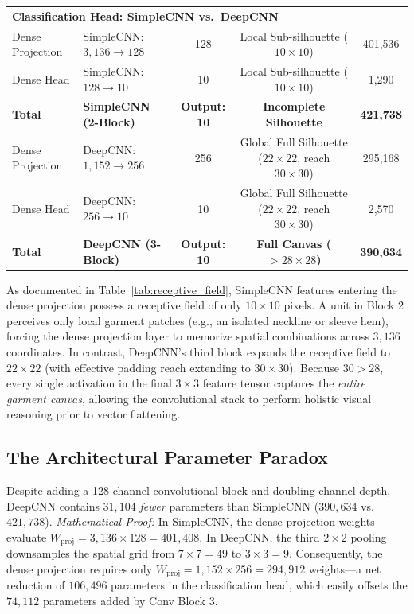 \documentclass[conference]{IEEEtran}
\begin{document}
\begin{table}[t]
\begin{tabular*}{\textwidth}{@{\extracolsep{\fill}}llccc@{}}
\midrule
\multicolumn{5}{l}{\textbf{Classification Head: SimpleCNN vs.\ DeepCNN}} \\
Dense Projection & SimpleCNN: $3{,}136 \to 128$ & 128 & Local Sub-silhouette ($10\times10$) & 401,536 \\
Dense Head       & SimpleCNN: $128 \to 10$      & 10  & Local Sub-silhouette ($10\times10$) & 1,290 \\
\textbf{Total}   & \textbf{SimpleCNN (2-Block)} & \textbf{Output: 10} & \textbf{Incomplete Silhouette} & \textbf{421,738} \\
\midrule
Dense Projection & DeepCNN: $1{,}152 \to 256$   & 256 & Global Full Silhouette ($22\times22$, reach $30\times30$) & 295,168 \\
Dense Head       & DeepCNN: $256 \to 10$        & 10  & Global Full Silhouette ($22\times22$, reach $30\times30$) & 2,570 \\
\textbf{Total}   & \textbf{DeepCNN (3-Block)}   & \textbf{Output: 10} & \textbf{Full Canvas ($>28\times28$)} & \textbf{390,634} \\
\bottomrule
\end{tabular*}
\end{table}

As documented in Table~\ref{tab:receptive_field}, SimpleCNN features entering the dense projection possess a receptive field of only $10 \times 10$ pixels. A unit in Block 2 perceives only local garment patches (e.g., an isolated neckline or sleeve hem), forcing the dense projection layer to memorize spatial combinations across $3{,}136$ coordinates. In contrast, DeepCNN's third block expands the receptive field to $22 \times 22$ (with effective padding reach extending to $30 \times 30$). Because $30 > 28$, every single activation in the final $3 \times 3$ feature tensor captures the \emph{entire garment canvas}, allowing the convolutional stack to perform holistic visual reasoning prior to vector flattening.

\subsection{The Architectural Parameter Paradox}
Despite adding a 128-channel convolutional block and doubling channel depth, DeepCNN contains $31{,}104$ \emph{fewer} parameters than SimpleCNN ($390{,}634$ vs.\ $421{,}738$).  
\emph{Mathematical Proof:} In SimpleCNN, the dense projection weights evaluate $W_{\text{proj}} = 3{,}136 \times 128 = 401{,}408$. In DeepCNN, the third $2\times2$ pooling downsamples the spatial grid from $7 \times 7 = 49$ to $3 \times 3 = 9$. Consequently, the dense projection requires only $W_{\text{proj}} = 1{,}152 \times 256 = 294{,}912$ weights---a net reduction of $106{,}496$ parameters in the classification head, which easily offsets the $74{,}112$ parameters added by Conv Block 3.
\end{document}

